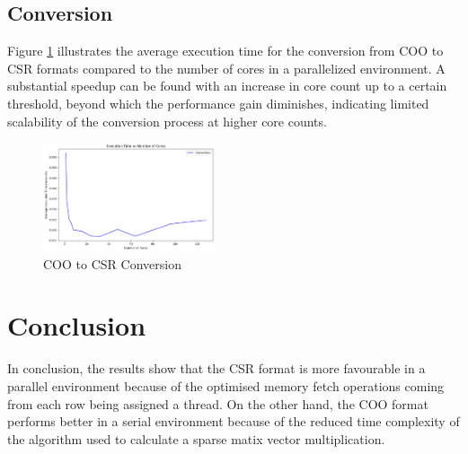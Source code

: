 \documentclass[conference]{IEEEtran}
\begin{document}
\subsection{Conversion}
Figure \ref{fig:conversion} illustrates the average execution time for the conversion from COO to CSR formats compared to the number of cores in a parallelized environment. 
A substantial speedup can be found with an increase in core count up to a certain threshold, beyond which the performance gain diminishes, indicating limited scalability of the conversion process at higher core counts.
\begin{figure}[H]
    \centering
    \includegraphics[width=0.45\textwidth]{../img/conversion.png}
    \caption{COO to CSR Conversion}
    \label{fig:conversion}
\end{figure}

\section{Conclusion}
In conclusion, the results show that the CSR format is more favourable in a parallel environment because of the optimised memory fetch operations coming from each row being assigned a thread. On the other hand, the COO format performs better in a serial environment because of the reduced time complexity of the algorithm used to calculate a sparse matix vector multiplication.
\end{document}
